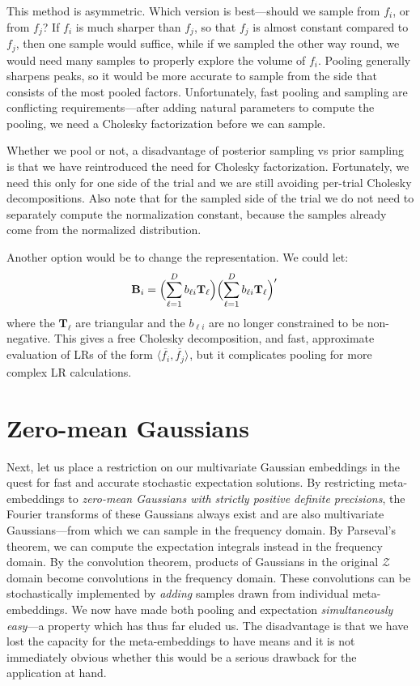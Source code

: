 \documentclass[a4paper,oneside,12pt,english]{report}
\def\expv#1#2{\bigl\langle#1\bigr\rangle_{#2}}
\def\Zset{\mathcal{Z}}
\def\Bmat{\mathbf{B}}
\def\Tmat{\mathbf{T}}
\def\Zset{\mathcal{Z}}
\def\dot#1#2{\expv{#1,#2}{}}
\def\normal#1{\overline{#1}}
\begin{document}
This method is asymmetric. Which version is best---should we sample from $f_i$, or from $f_j$? If $f_i$ is much sharper than $f_j$, so that $f_j$ is almost constant compared to $f_j$, then one sample would suffice, while if we sampled the other way round, we would need many samples to properly explore the volume of $f_i$. Pooling generally sharpens peaks, so it would be more accurate to sample from the side that consists of the most pooled factors. Unfortunately, fast pooling and sampling are conflicting requirements---after adding natural parameters to compute the pooling, we need a Cholesky factorization before we can sample.

Whether we pool or not, a disadvantage of posterior sampling vs prior sampling is that we have reintroduced the need for Cholesky factorization. Fortunately, we need this only for one side of the trial and we are still avoiding per-trial Cholesky decompositions. Also note that for the sampled side of the trial we do not need to separately compute the normalization constant, because the samples already come from the normalized distribution. 

Another option would be to change the representation. We could let:
\begin{align}
\Bmat_i &= \Bigl(\sum_{\ell=1}^D b_{\ell i} \Tmat_\ell \Bigr)\Bigl(\sum_{\ell=1}^D b_{\ell i} \Tmat_\ell \Bigr)'
\end{align}  
where the $\Tmat_\ell$ are triangular and the $b_{\ell i}$ are no longer constrained to be non-negative. This gives a free Cholesky decomposition, and fast, approximate evaluation of LRs of the form $\dot{\normal{f_i}}{\normal{f_j}}$, but it complicates pooling for more complex LR calculations.\\


\section{Zero-mean Gaussians}
Next, let us place a restriction on our multivariate Gaussian embeddings in the quest for fast and accurate stochastic expectation solutions. By restricting meta-embeddings to \emph{zero-mean Gaussians with strictly positive definite precisions}, the Fourier transforms of these Gaussians always exist and are also multivariate Gaussians---from which we can sample in the frequency domain. By Parseval's theorem, we can compute the expectation integrals instead in the frequency domain. By the convolution theorem, products of Gaussians in the original $\Zset$ domain become convolutions in the frequency domain. These convolutions can be stochastically implemented by \emph{adding} samples drawn from individual meta-embeddings. We now have made both pooling and expectation \emph{simultaneously easy}---a property which has thus far eluded us. The disadvantage is that we have lost the capacity for the meta-embeddings to have means and it is not immediately obvious whether this would be a serious drawback for the application at hand. 
\end{document}
